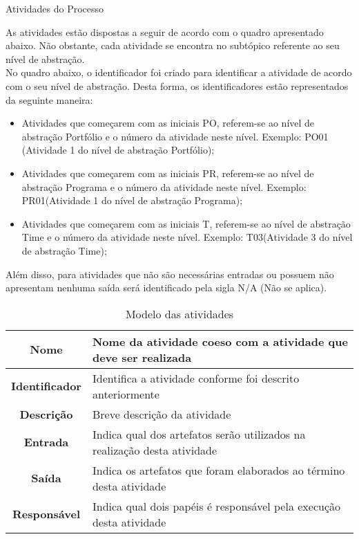 {

	\large{Atividades do Processo \\}

	\tab As atividades  estão dispostas a seguir de acordo com o quadro apresentado abaixo. Não obstante, cada atividade se encontra no subtópico referente ao seu nível de abstração. \\
	\tab No quadro abaixo, o identificador foi criado para identificar a atividade de acordo com o seu nível de abstração. Desta forma, os identificadores estão representados da seguinte maneira: 

	\begin{itemize}
		\item Atividades que começarem com as iniciais PO, referem-se ao nível de abstração Portfólio e o número da atividade neste nível. Exemplo: PO01 (Atividade 1 do nível de abstração Portfólio);
		\item Atividades que começarem com as iniciais PR, referem-se ao nível de abstração Programa e o número da atividade neste nível. Exemplo: PR01(Atividade 1 do nível de abstração Programa);
		\item Atividades que começarem com as iniciais T, referem-se ao nível de abstração Time e o número da atividade neste nível. Exemplo: T03(Atividade 3 do nível de abstração Time); 
	\end{itemize}

	\tab Além disso, para atividades que não são necessárias entradas ou possuem não apresentam nenhuma saída será identificado pela sigla N/A (Não se aplica).\\


	\begin{table}[H]
                \centering
                \caption{Modelo das atividades}
                \begin{tabular}{c|p{10cm}}
                    \hline
                    \textbf{Nome}            & Nome da atividade coeso com a atividade que deve ser realizada\\
                    \hline
                    \textbf{Identificador} & Identifica a atividade conforme foi descrito anteriormente\\ 
                    \hline
                    \textbf{Descrição}   & Breve descrição da atividade\\ 
                    \hline
                    \textbf{Entrada}           & Indica qual dos artefatos serão utilizados na realização desta atividade\\
                    \hline
                    \textbf{Saída}            &  Indica os artefatos que foram elaborados ao término desta atividade\\
                    \hline
                    \textbf{Responsável}            & Indica qual dois papéis é responsável pela execução  desta atividade\\
                    \hline                    
                \end{tabular}
            \end{table}


}
